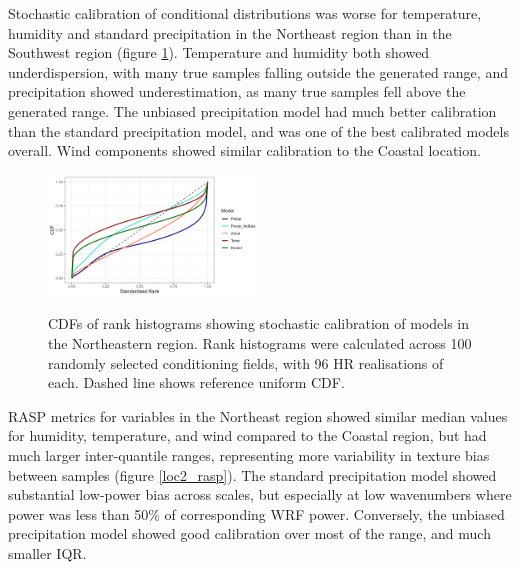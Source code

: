 \documentclass{ametsocV6.1}
\begin{document}
Stochastic calibration of conditional distributions was worse for temperature, humidity and standard precipitation in the Northeast region than in the Southwest region (figure \ref{loc2_rankhist}). Temperature and humidity both showed underdispersion, with many true samples falling outside the generated range, and precipitation showed underestimation, as many true samples fell above the generated range. The unbiased precipitation model had much better calibration than the standard precipitation model, and was one of the best calibrated models overall. Wind components showed similar calibration to the Coastal location. 
\begin{figure}[H]
  \noindent\includegraphics[width=0.5\textwidth,angle=0]{final/Location2_RankHist.png}\\
  \caption{CDFs of rank histograms showing stochastic calibration of models in the Northeastern region. Rank histograms were calculated across 100 randomly selected conditioning fields, with 96 HR realisations of each. Dashed line shows reference uniform CDF.}\label{loc2_rankhist}
\end{figure}
RASP metrics for variables in the Northeast region showed similar median values for humidity, temperature, and wind compared to the Coastal region, but had much larger inter-quantile ranges, representing more variability in texture bias between samples (figure \ref{loc2_rasp}). The standard precipitation model showed substantial low-power bias across scales, but especially at low wavenumbers where power was less than 50\% of corresponding WRF power. Conversely, the unbiased precipitation model showed good calibration over most of the range, and much smaller IQR. 
\end{document}
